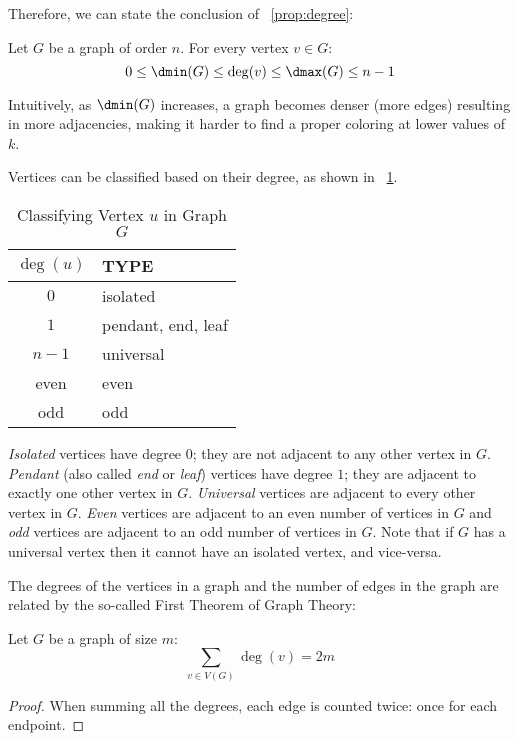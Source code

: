 Therefore, we can state the conclusion of \propname~\ref{prop:degree}:

\begin{proposition}
  \label{prop:degree}
  Let \(G\) be a graph of order \(n\).  For every vertex \(v\in G\):
\[0\le\dmin(G)\le\deg(v)\le\dmax(G)\le n-1\]
\end{proposition}

Intuitively, as \(\dmin(G)\) increases, a graph becomes denser (more edges) resulting in more adjacencies, making it
harder to find a proper coloring at lower values of \(k\).

Vertices can be classified based on their degree, as shown in \tablename~\ref{tab:degree}.

\begin{table}[H]
  \centering
  \caption{Classifying Vertex \(u\) in Graph \(G\)}
  \label{tab:degree}
  \begin{tabular}{|c|l|}
    \hline
    \(\deg(u)\) & TYPE \\
    \hline
    \(0\) & isolated \\
    \(1\) & pendant, end, leaf \\
    \(n-1\) & universal \\
    even & even \\
    odd & odd \\
    \hline
  \end{tabular}
\end{table}

\emph{Isolated} vertices have degree \(0\); they are not adjacent to any other vertex in \(G\).  \emph{Pendant}
(also called \emph{end} or \emph{leaf}) vertices have degree \(1\); they are adjacent to exactly one other vertex
in \(G\).  \emph{Universal} vertices are adjacent to every other vertex in \(G\).  \emph{Even} vertices are adjacent
to an even number of vertices in \(G\) and \emph{odd} vertices are adjacent to an odd number of vertices in \(G\).
Note that if \(G\) has a universal vertex then it cannot have an isolated vertex, and vice-versa.

The degrees of the vertices in a graph and the number of edges in the graph are related by the so-called First
Theorem of Graph Theory:

\begin{theorem}
  \label{thm:first}
  Let \(G\) be a graph of size \(m\):
  \[\sum_{v\in V(G)}\deg(v)=2m\]
\end{theorem}

\begin{proof}
  When summing all the degrees, each edge is counted twice: once for each endpoint.
\end{proof}

